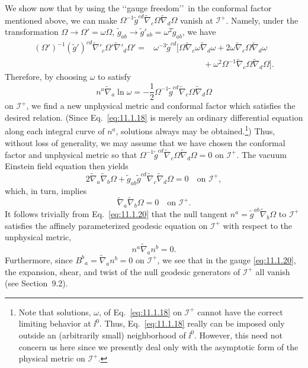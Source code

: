 We show now that by using the \lq\lq gauge freedom\rq\rq\ in the conformal factor
mentioned above, we can make
\(\Omega^{-1}\tilde g^{cd}\tilde\nabla_c\Omega\tilde\nabla_d\Omega\) vanish at
\(\mathcal I^+\). Namely, under the transformation
\(\Omega\to\Omega'=\omega\Omega\),
\(\tilde g_{ab}\to\tilde g'_{ab}=\omega^2\tilde g_{ab}\), we have
\begin{equation}
  \begin{aligned}
  (\Omega')^{-1}(\tilde g')^{cd}
  \tilde\nabla'_c\Omega'\tilde\nabla'_d\Omega'
  ={}&\omega^{-3}\tilde g^{cd}\bigl[
  \Omega\tilde\nabla_c\omega\tilde\nabla_d\omega
  +2\omega\tilde\nabla_c\Omega\tilde\nabla_d\omega\\
  &\qquad\qquad\qquad
  +\omega^2\Omega^{-1}\tilde\nabla_c\Omega\tilde\nabla_d\Omega
  \bigr].
  \end{aligned}
  \tag{11.1.17}\label{eq:11.1.17}
\end{equation}
Therefore, by choosing \(\omega\) to satisfy
\begin{equation}
  n^a\tilde\nabla_a\ln\omega
  =-\frac12\Omega^{-1}\tilde g^{cd}
  \tilde\nabla_c\Omega\tilde\nabla_d\Omega
  \tag{11.1.18}\label{eq:11.1.18}
\end{equation}
on \(\mathcal I^+\), we find a new unphysical metric and conformal factor which
satisfies the desired relation. (Since Eq.~\eqref{eq:11.1.18} is merely an ordinary
differential equation along each integral curve of \(n^a\), solutions always may be
obtained.\footnote{Note that solutions, \(\omega\), of Eq.~\eqref{eq:11.1.18} on
\(\mathcal I^+\) cannot have the correct limiting behavior at \(\ii^0\). Thus,
Eq.~\eqref{eq:11.1.18} really can be imposed only outside an (arbitrarily small)
neighborhood of \(\ii^0\). However, this need not concern us here since we presently
deal only with the asymptotic form of the physical metric on \(\mathcal I^+\).})
Thus, without loss of generality, we may assume that we have chosen the conformal
factor and unphysical metric so that
\(\Omega^{-1}\tilde g^{cd}\tilde\nabla_c\Omega\tilde\nabla_d\Omega=0\) on
\(\mathcal I^+\). The vacuum Einstein field equation then yields
\begin{equation}
  2\tilde\nabla_a\tilde\nabla_b\Omega+
  \tilde g_{ab}\tilde g^{cd}\tilde\nabla_c\tilde\nabla_d\Omega=0
  \quad\text{on }\mathcal I^+,
  \tag{11.1.19}\label{eq:11.1.19}
\end{equation}
which, in turn, implies
\begin{equation}
  \tilde\nabla_a\tilde\nabla_b\Omega=0
  \quad\text{on }\mathcal I^+.
  \tag{11.1.20}\label{eq:11.1.20}
\end{equation}
It follows trivially from Eq.~\eqref{eq:11.1.20} that the null tangent
\(n^a=\tilde g^{ab}\tilde\nabla_b\Omega\) to \(\mathcal I^+\) satisfies the affinely
parameterized geodesic equation on \(\mathcal I^+\) with respect to the unphysical
metric,
\begin{equation}
  n^a\tilde\nabla_an^b=0.
  \tag{11.1.21}\label{eq:11.1.21}
\end{equation}
Furthermore, since \(B^b{}_a=\tilde\nabla_an^b=0\) on \(\mathcal I^+\), we see that
in the gauge \eqref{eq:11.1.20}, the expansion, shear, and twist of the null geodesic
generators of \(\mathcal I^+\) all vanish (see Section~9.2).

